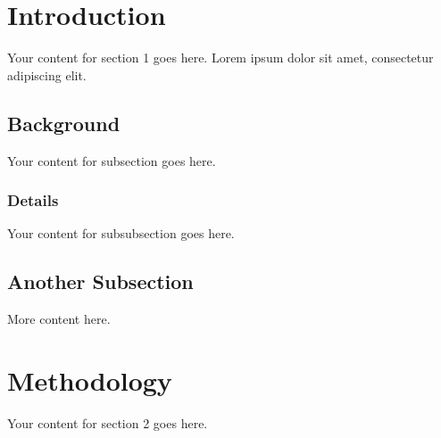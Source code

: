 \documentclass{article}
\begin{document}
\section{Introduction}
Your content for section 1 goes here. Lorem ipsum dolor sit amet, consectetur adipiscing elit.

\subsection{Background}
Your content for subsection goes here.

\subsubsection{Details}
Your content for subsubsection goes here.

\subsection{Another Subsection}
More content here.

\section{Methodology}
Your content for section 2 goes here.
\end{document}
